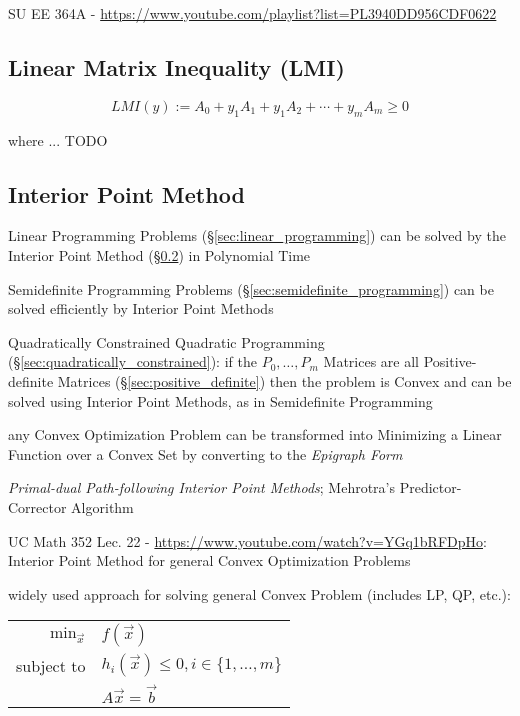 SU EE 364A - \url{https://www.youtube.com/playlist?list=PL3940DD956CDF0622}



\subsection{Linear Matrix Inequality (LMI)}\label{sec:lmi}

\[
  LMI(y) := A_0 + y_1A_1 + y_1A_2 + \cdots + y_mA_m \geq 0
\]

where ... TODO



\subsection{Interior Point Method}\label{sec:interior_point}

Linear Programming Problems (\S\ref{sec:linear_programming}) can be solved by
the Interior Point Method (\S\ref{sec:interior_point}) in Polynomial Time

Semidefinite Programming Problems (\S\ref{sec:semidefinite_programming})
can be solved efficiently by Interior Point Methods

Quadratically Constrained Quadratic Programming
(\S\ref{sec:quadratically_constrained}): if the $P_0,\ldots,P_m$ Matrices are
all Positive-definite Matrices (\S\ref{sec:positive_definite}) then the problem
is Convex and can be solved using Interior Point Methods, as in Semidefinite
Programming

any Convex Optimization Problem can be transformed into Minimizing a Linear
Function over a Convex Set by converting to the \emph{Epigraph Form}

\emph{Primal-dual Path-following Interior Point Methods}; Mehrotra's
Predictor-Corrector Algorithm

\asterism

UC Math 352 Lec. 22 - \url{https://www.youtube.com/watch?v=YGq1bRFDpHo}:
Interior Point Method for general Convex Optimization Problems

widely used approach for solving general Convex Problem (includes LP, QP,
etc.):

\begin{tabular}{r l}
  $\mathrm{min}_{\vec{x}}$ & $f(\vec{x})$     \\
  subject to               & $h_i(\vec{x}) \leq 0, i \in \{1,\ldots,m\}$ \\
                           & $A\vec{x} = \vec{b}$   \\
\end{tabular}

